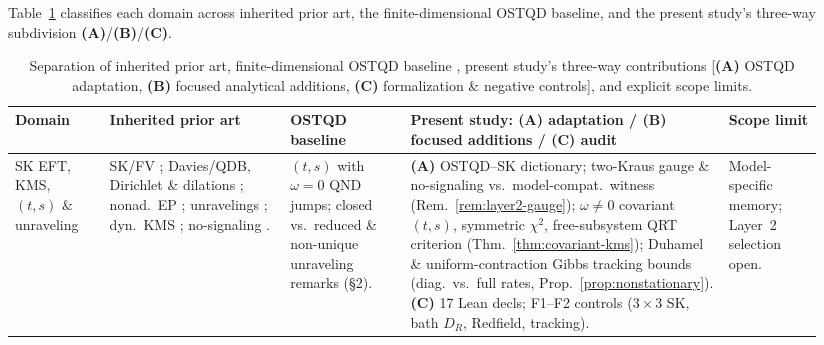 \documentclass[11pt,a4paper]{article}
\theoremstyle{definition}
\theoremstyle{remark}
\newcommand{\1}{\mathbf{1}}
\begin{document}
Table~\ref{tab:literature} classifies each domain across inherited prior art, the finite-dimensional OSTQD baseline, and the present study's three-way subdivision \textbf{(A)}/\textbf{(B)}/\textbf{(C)}.

\begin{table}[!tb]
\centering\scriptsize\setlength{\tabcolsep}{3.2pt}
\caption{Separation of inherited prior art, finite-dimensional OSTQD baseline \cite{Soga2026OSTQD}, present study's three-way contributions [\textbf{(A)} OSTQD adaptation, \textbf{(B)} focused analytical additions, \textbf{(C)} formalization \& negative controls], and explicit scope limits.}
\label{tab:literature}
\begin{tabular}{@{}>{\raggedright\arraybackslash}p{0.11\linewidth}>{\raggedright\arraybackslash}p{0.21\linewidth}>{\raggedright\arraybackslash}p{0.14\linewidth}>{\raggedright\arraybackslash}p{0.37\linewidth}>{\raggedright\arraybackslash}p{0.11\linewidth}@{}}
\toprule
Domain & Inherited prior art & OSTQD baseline \cite{Soga2026OSTQD} & Present study: \textbf{(A)} adaptation / \textbf{(B)} focused additions / \textbf{(C)} audit & Scope limit \\
\midrule
SK EFT, KMS, $(t,s)$ \& unraveling & SK/FV \cite{Schwinger1961,Keldysh1964,FeynmanVernon1963,WuLee2005}; Davies/QDB, Dirichlet \& dilations \cite{Davies1974,Alicki1976,Evans1977,Frigerio1978,Frigerio1985,AttalJoye2007,Temme2010,AlhambraWoods2017,Trushechkin2021}; nonad.\ EP \cite{ChetriteMallick2012,HorowitzSagawa2014}; unravelings \cite{WisemanDiosi2001}; dyn.\ KMS \cite{CrossleyGloriosoLiu2017}; no-signaling \cite{Gisin1990}. & $(t,s)$ with $\omega=0$ QND jumps; closed vs.\ reduced \& non-unique unraveling remarks (\S2). & \textbf{(A)} OSTQD--SK dictionary; two-Kraus gauge \& no-signaling vs.\ model-compat.\ witness (Rem.~\ref{rem:layer2-gauge}); $\omega\neq 0$ covariant $(t,s)$, symmetric $\chi^2$, free-subsystem QRT criterion (Thm.~\ref{thm:covariant-kms}); Duhamel \& uniform-contraction Gibbs tracking bounds (diag.\ vs.\ full rates, Prop.~\ref{prop:nonstationary}). \textbf{(C)} 17 Lean decls; F1--F2 controls ($3\times 3$ SK, bath $D_R$, Redfield, tracking). & Model-specific memory; Layer~2 selection open. \\

\end{tabular}
\end{table}
\end{document}
